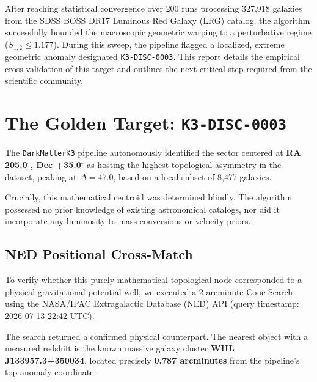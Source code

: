 \documentclass[aps,prd,twocolumn,nofootinbib,superscriptaddress,10pt]{revtex4-2}
\begin{document}
After reaching statistical convergence over 200 runs processing 327,918 galaxies from the SDSS BOSS DR17 Luminous Red Galaxy (LRG) catalog, the algorithm successfully bounded the macroscopic geometric warping to a perturbative regime ($S_{1,2} \le 1.177$). During this sweep, the pipeline flagged a localized, extreme geometric anomaly designated \texttt{K3-DISC-0003}. This report details the empirical cross-validation of this target and outlines the next critical step required from the scientific community.

\section{The Golden Target: \texttt{K3-DISC-0003}}

The \texttt{DarkMatterK3} pipeline autonomously identified the sector centered at \textbf{RA 205.0$^\circ$, Dec +35.0$^\circ$} as hosting the highest topological asymmetry in the dataset, peaking at $\Delta = 47.0$, based on a local subset of 8,477 galaxies. 

Crucially, this mathematical centroid was determined blindly. The algorithm possessed no prior knowledge of existing astronomical catalogs, nor did it incorporate any luminosity-to-mass conversions or velocity priors.

\subsection{NED Positional Cross-Match}

To verify whether this purely mathematical topological node corresponded to a physical gravitational potential well, we executed a 2-arcminute Cone Search using the NASA/IPAC Extragalactic Database (NED) API (query timestamp: 2026-07-13 22:42 UTC).

The search returned a confirmed physical counterpart. The nearest object with a measured redshift is the known massive galaxy cluster \textbf{WHL J133957.3+350034}, located precisely \textbf{0.787 arcminutes} from the pipeline's top-anomaly coordinate. 

\begin{table}[h]
\centering
\caption{NED Cross-Match for RA 205.0$^\circ$, Dec +35.0$^\circ$}
\label{tab:ned}
\end{table}
\end{document}
